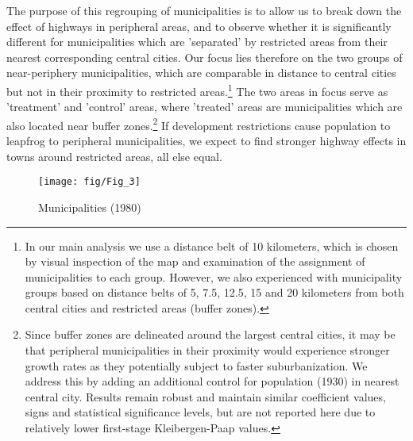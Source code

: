 \documentclass[a4paper,authoryear,review]{elsarticle}  	%
\begin{document}
	The purpose of this regrouping of municipalities is to allow us to break down the effect of highways in peripheral areas, and to observe whether it is significantly different for municipalities which are 'separated' by restricted areas from their nearest corresponding central cities. Our focus lies therefore on the two groups of near-periphery municipalities, which are comparable in distance to central cities but not in their proximity to restricted areas.\footnote{In our main analysis we use a distance belt of 10 kilometers, which is chosen by visual inspection of the map and examination of the assignment of municipalities to each group. However, we also experienced with municipality groups based on distance belts of 5, 7.5, 12.5, 15 and 20 kilometers from both central cities and restricted areas (buffer zones).} The two areas in focus serve as 'treatment' and 'control' areas, where 'treated' areas are municipalities which are also located near buffer zones.\footnote{Since buffer zones are delineated around the largest central cities, it may be that peripheral municipalities in their proximity would experience stronger growth rates as they potentially subject to faster suburbanization. We address this by adding an additional control for population (1930) in nearest central city. Results remain robust and maintain similar coefficient values, signs and statistical significance levels, but are not reported here due to relatively lower first-stage Kleibergen-Paap values.}
	If development restrictions cause population to leapfrog to peripheral municipalities, we expect to find stronger highway effects in towns around restricted areas, all else equal. 
	
	\begin{figure}[!hbtp]
		\centering
		\caption{Municipalities (1980)}
		\texttt{[image: fig/Fig\_3]}\label{ch3.fig:3}
	\end{figure}
		
\end{document}
